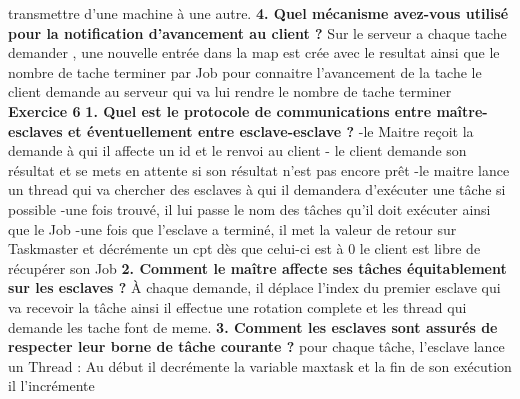 \documentclass{article}
\begin{document}
transmettre d'une machine à une autre.
\newline
\newline
\textbf{4. Quel mécanisme avez-vous utilisé pour la notification d’avancement au client ?}
\newline
\newline
Sur le serveur a chaque tache demander , une nouvelle entrée dans la map est crée avec le resultat ainsi que le nombre de tache terminer par Job
pour connaitre l'avancement de la tache le client demande au serveur qui va lui rendre le nombre de tache terminer
\newline
\newline
\textbf{Exercice 6}
\newline
\newline
\textbf{1. Quel est le protocole de communications entre maître-esclaves et éventuellement entre
esclave-esclave ?}
\newline
{}-le Maitre reçoit la demande à qui il affecte un id et le renvoi au client 
- le client demande son résultat et se mets en attente si son résultat n'est pas encore prêt 
-le maitre lance un thread qui va chercher  des esclaves à qui il demandera d'exécuter une tâche si possible 
-une fois trouvé, il lui passe le nom des tâches qu'il doit exécuter ainsi que le Job
-une fois que l'esclave a terminé, il met la valeur de retour sur Taskmaster et décrémente un cpt dès que celui-ci est à 0 le client est libre de récupérer son Job
\newline
\newline
\textbf{2. Comment le maître affecte ses tâches équitablement sur les esclaves ?}
\newline
\newline
À chaque demande, il déplace l'index du premier esclave qui va recevoir la tâche ainsi il effectue une rotation complete et les thread qui demande 
les tache font de meme.
\newline
\newline
\textbf{3. Comment les esclaves sont assurés de respecter leur borne de tâche courante ?}
\newline
\newline
pour chaque tâche, l'esclave lance un Thread : Au début il decrémente la variable maxtask et la fin de son exécution il l'incrémente
\end{document}
